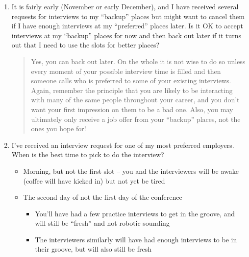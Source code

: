 \documentclass{\classes/econtex}
\providecommand\phantomsection{}
\begin{document}
\begin{enumerate}
\item  It is fairly early (November or early December), and I have received several requests for interviews to my ``backup'' places but might want to cancel them if I have enough interviews at my ``preferred'' places later.  Is it OK to accept interviews at my ``backup'' places for now and then back out later if it turns out that I need to use the slots for better places?

  \begin{quote}
    Yes, you can back out later.  On the whole it is not wise to do so unless every moment of your possible interview time is filled and then someone calls who is preferred to some of your existing interviews.  Again, remember the principle that you are likely to be interacting with many of the same people throughout your career, and you don't want your first impression on them to be a bad one.  Also, you may ultimately only receive a job offer from your ``backup'' places, not the ones you hope for!

  \end{quote}
  \ifdvi\phantomsection\hypertarget{InterviewBestTime}{}\fi
  
\item  I've received an interview request for one of my most preferred employers. When is the best time to pick to do the interview?
  \begin{itemize}
  \item Morning, but not the first slot -- you and the interviewers will be awake (coffee will have kicked in) but not yet be tired
  \item The second day of not the first day of the conference
    \begin{itemize}
    \item You'll have had a few practice interviews to get in the groove, and will still be ``fresh'' and not robotic sounding
    \item The interviewers similarly will have had enough interviews to be in their groove, but will also still be fresh
    \end{itemize}
  \end{itemize}


\end{enumerate}
\end{document}
